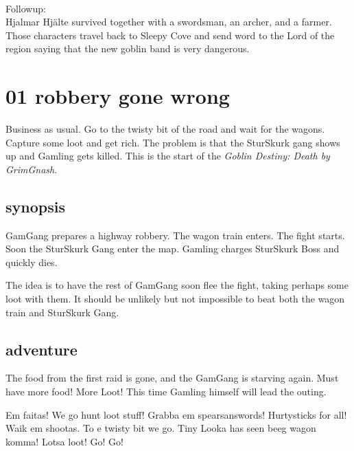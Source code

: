 \

Followup: \\
Hjalmar Hjälte survived together with a swordsman, an archer, and a farmer. Those characters travel back to Sleepy Cove and send word to the Lord of the region saying that the new goblin band is very dangerous.




\newpage
\section*{01 robbery gone wrong}

Business as usual. Go to the twisty bit of the road and wait for the wagons. Capture some loot and get rich. The problem is that the SturSkurk gang shows up and Gamling gets killed. This is the start of the \emph{Goblin Destiny: Death by GrimGnash}.


\subsection*{synopsis}

GamGang prepares a highway robbery. The wagon train enters. The fight starts. Soon the SturSkurk Gang enter the map. Gamling charges SturSkurk Boss and quickly dies.

The idea is to have the rest of GamGang soon flee the fight, taking perhaps some loot with them. It should be unlikely but not impossible to beat both the wagon train and SturSkurk Gang.


\subsection*{adventure}

The food from the first raid is gone, and the GamGang is starving again. Must have more food! More Loot! This time Gamling himself will lead the outing.

\begin{readoutloud}
Em faitas! We go hunt loot stuff! Grabba em spearsanswords! Hurtysticks for all! Waik em shootas. To e twisty bit we go. Tiny Looka has seen beeg wagon komma! Lotsa loot! Go! Go!
\end{readoutloud}

